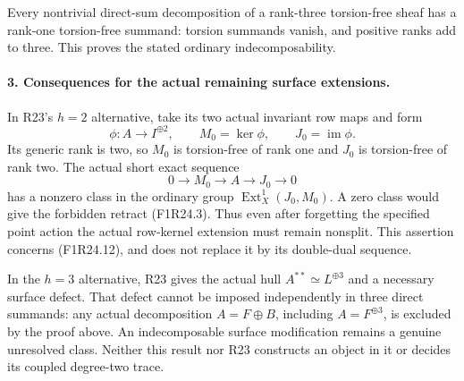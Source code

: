 Every nontrivial direct-sum decomposition of a rank-three
torsion-free sheaf has a rank-one torsion-free summand:
torsion summands vanish, and positive ranks add to three.
This proves the stated ordinary indecomposability.

\paragraph{3. Consequences for the actual remaining surface extensions.}
In R23's $h=2$ alternative, take its two actual invariant row
maps and form
\[
 \phi:A\longrightarrow I^{\oplus2},\qquad
 M_0=\ker\phi,\qquad J_0=\operatorname{im}\phi.
 \tag{F1R24.11}
\]
Its generic rank is two, so $M_0$ is torsion-free of rank one
and $J_0$ is torsion-free of rank two. The actual short exact
sequence
\[
                 0\longrightarrow M_0\longrightarrow A
                        \longrightarrow J_0\longrightarrow0
 \tag{F1R24.12}
\]
has a nonzero class in the ordinary group
$\operatorname{Ext}^1_X(J_0,M_0)$. A zero class would give the
forbidden retract (F1R24.3). Thus even after forgetting the
specified point action the actual row-kernel extension must
remain nonsplit. This assertion concerns (F1R24.12), and
does not replace it by its double-dual sequence.

In the $h=3$ alternative, R23 gives the actual hull
$A^{**}\simeq L^{\oplus3}$ and a necessary surface defect.
That defect cannot be imposed independently in three direct
summands: any actual decomposition $A=F\oplus B$, including
$A=F^{\oplus3}$, is excluded by the proof above. An
indecomposable surface modification remains a genuine
unresolved class. Neither this result nor R23 constructs an
object in it or decides its coupled degree-two trace.

